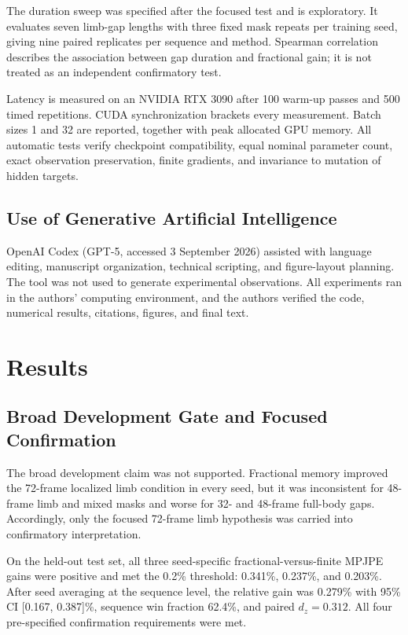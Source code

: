 \documentclass[fractalfract,article,submit,moreauthors,pdftex]{Definitions/mdpi}
\begin{document}
The duration sweep was specified after the focused test and is exploratory. It evaluates seven limb-gap lengths with three fixed mask repeats per training seed, giving nine paired replicates per sequence and method. Spearman correlation describes the association between gap duration and fractional gain; it is not treated as an independent confirmatory test.

Latency is measured on an NVIDIA RTX 3090 after 100 warm-up passes and 500 timed repetitions. CUDA synchronization brackets every measurement. Batch sizes 1 and 32 are reported, together with peak allocated GPU memory. All automatic tests verify checkpoint compatibility, equal nominal parameter count, exact observation preservation, finite gradients, and invariance to mutation of hidden targets.

\subsection{Use of Generative Artificial Intelligence}

OpenAI Codex (GPT-5, accessed 3 September 2026) assisted with language editing, manuscript organization, technical scripting, and figure-layout planning. The tool was not used to generate experimental observations. All experiments ran in the authors' computing environment, and the authors verified the code, numerical results, citations, figures, and final text.

\section{Results}

\subsection{Broad Development Gate and Focused Confirmation}

The broad development claim was not supported. Fractional memory improved the 72-frame localized limb condition in every seed, but it was inconsistent for 48-frame limb and mixed masks and worse for 32- and 48-frame full-body gaps. Accordingly, only the focused 72-frame limb hypothesis was carried into confirmatory interpretation.

On the held-out test set, all three seed-specific fractional-versus-finite MPJPE gains were positive and met the 0.2\% threshold: 0.341\%, 0.237\%, and 0.203\%. After seed averaging at the sequence level, the relative gain was 0.279\% with 95\% CI [0.167, 0.387]\%, sequence win fraction 62.4\%, and paired $d_z=0.312$. All four pre-specified confirmation requirements were met.
\end{document}
